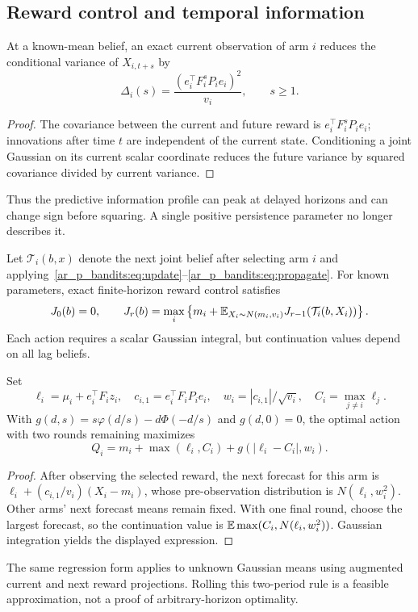 \subsection{Reward control and temporal information}
\begin{proposition}
At a known-mean belief, an exact current observation of arm $i$ reduces the conditional variance of $X_{i,t+s}$ by
\begin{equation}
\boxed{\Delta_i(s)=\frac{(e_i^\top F_i^sP_ie_i)^2}{v_i},\qquad s\geq1.}
\label{ar_p_bandits:eq:reduction}
\end{equation}
\end{proposition}
\begin{proof}
The covariance between the current and future reward is $e_i^\top F_i^sP_ie_i$; innovations after time $t$ are independent of the current state. Conditioning a joint Gaussian on its current scalar coordinate reduces the future variance by squared covariance divided by current variance.
\end{proof}
Thus the predictive information profile can peak at delayed horizons and can change sign before squaring. A single positive persistence parameter no longer describes it.

Let $\mathcal T_i(b,x)$ denote the next joint belief after selecting arm $i$ and applying~\eqref{ar_p_bandits:eq:update}--\eqref{ar_p_bandits:eq:propagate}. For known parameters, exact finite-horizon reward control satisfies
\begin{equation}
J_0(b)=0,\qquad
J_r(b)=\max_i\left\{m_i+\mathbb E_{X_i\sim N(m_i,v_i)}J_{r-1}(\mathcal T_i(b,X_i))\right\}.
\label{ar_p_bandits:eq:bellman}
\end{equation}
Each action requires a scalar Gaussian integral, but continuation values depend on all lag beliefs.

\begin{theorem}
Set
\[
\ell_i=\mu_i+e_i^\top F_iz_i,\quad
c_{i,1}=e_i^\top F_iP_ie_i,\quad
w_i=|c_{i,1}|/\sqrt{v_i},\quad C_i=\max_{j\ne i}\ell_j.
\]
With $g(d,s)=s\varphi(d/s)-d\Phi(-d/s)$ and $g(d,0)=0$, the optimal action with two rounds remaining maximizes
\begin{equation}
\boxed{Q_i=m_i+\max(\ell_i,C_i)+g(|\ell_i-C_i|,w_i).}
\label{ar_p_bandits:eq:two-period}
\end{equation}
\end{theorem}
\begin{proof}
After observing the selected reward, the next forecast for this arm is
$\ell_i+(c_{i,1}/v_i)(X_i-m_i)$, whose pre-observation distribution is $N(\ell_i,w_i^2)$. Other arms' next forecast means remain fixed. With one final round, choose the largest forecast, so the continuation value is $\mathbb E\max(C_i,N(\ell_i,w_i^2))$. Gaussian integration yields the displayed expression.
\end{proof}
The same regression form applies to unknown Gaussian means using augmented current and next reward projections. Rolling this two-period rule is a feasible approximation, not a proof of arbitrary-horizon optimality.

